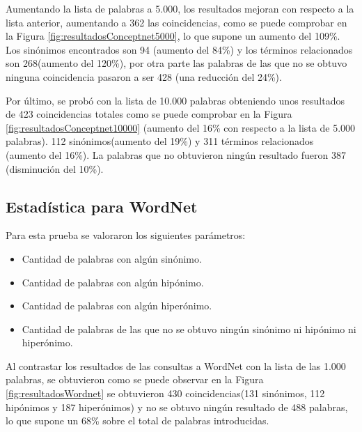 Aumentando la lista de palabras a 5.000, los resultados mejoran con respecto a la lista anterior, aumentando a 362 las coincidencias, como se puede comprobar en la Figura \ref{fig:resultadosConceptnet5000}, lo que supone un aumento del 109\%. Los sinónimos encontrados son 94 (aumento del 84\%) y los términos relacionados son 268(aumento del 120\%), por otra parte las palabras de las que no se obtuvo ninguna coincidencia pasaron a ser 428 (una reducción del 24\%).


Por último, se probó con la lista de 10.000 palabras obteniendo unos resultados de 423 coincidencias totales como se puede comprobar en la Figura \ref{fig:resultadosConceptnet10000} (aumento del 16\% con respecto a la lista de 5.000 palabras). 112 sinónimos(aumento del 19\%) y 311 términos relacionados (aumento del 16\%). La palabras que no obtuvieron ningún resultado fueron 387 (disminución del 10\%).



\subsection{Estadística para WordNet}
\label{cap:subsec:pruebaWordnet}

Para esta prueba se valoraron los siguientes parámetros:
\begin{itemize}
	\item Cantidad de palabras con algún sinónimo.
	\item Cantidad de palabras con algún hipónimo.
	\item Cantidad de palabras con algún hiperónimo.
	\item Cantidad de palabras de las que no se obtuvo ningún sinónimo ni hipónimo ni hiperónimo.
\end{itemize}

Al contrastar los resultados de las consultas a WordNet con la lista de las 1.000 palabras, se obtuvieron como se puede observar en la Figura \ref{fig:resultadosWordnet} se obtuvieron 430 coincidencias(131 sinónimos, 112 hipónimos y 187 hiperónimos) y no se obtuvo ningún resultado de 488 palabras, lo que supone un 68\% sobre el total de palabras introducidas.

